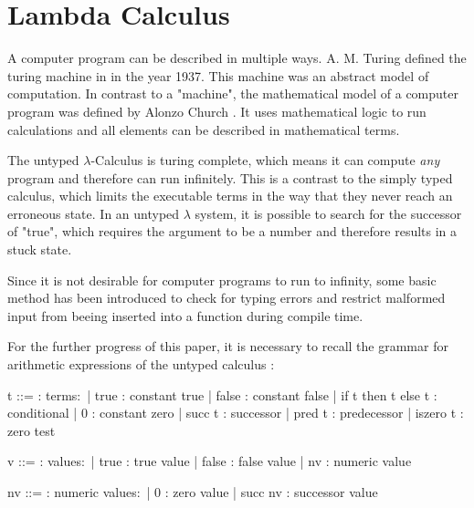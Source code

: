\section{Lambda Calculus}

A computer program can be described in multiple
ways. A. M. Turing defined the turing machine
in \cite{aturingMachine} in the year 1937. This
machine was an abstract model of computation.
In contrast to a "machine", the mathematical model
of a computer program was defined by Alonzo Church
\cite{churchLambda}. It uses mathematical logic
to run calculations and all elements can be described
in mathematical terms.

The untyped $\lambda$-Calculus is turing complete,
which means it can compute \textit{any} program and
therefore can run infinitely. This is a contrast to
the simply typed calculus, which limits the executable
terms in the way that they never reach an erroneous state.
In an untyped $\lambda$ system, it is possible to search
for the successor of "true", which
requires the argument to be a number and therefore
results in a stuck state.

Since it is not desirable for computer programs to run to infinity,
some basic method has been introduced \cite{churchLogic} to check for typing errors
and restrict malformed input from beeing inserted into a function
during compile time.


For the further progress of this paper, it is necessary to recall
the grammar for arithmetic expressions of the untyped calculus \cite{pierce2002ProgLang}:

\begin{bnfgrammar}
    t ::= : terms$\colon$
    | true : constant true
    | false : constant false
    | if t then t else t : conditional
    | 0 : constant zero
    | succ t : successor
    | pred t : predecessor
    | iszero t : zero test
\end{bnfgrammar}

\begin{bnfgrammar}
    v ::= : values$\colon$
    | true : true value
    | false : false value
    | nv : numeric value
\end{bnfgrammar}

\begin{bnfgrammar}
    nv ::= : numeric values$\colon$
    | 0 : zero value
    | succ nv : successor value
\end{bnfgrammar}


